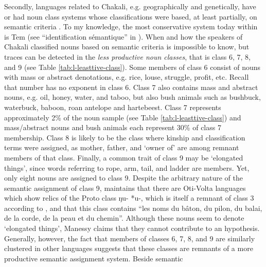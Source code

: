 \begin{exe}
\begin{exe}
\begin{exe}
\begin{exe}
\begin{exe}
\begin{exe}
Secondly, languages related to Chakali, e.g. geographically and genetically,  
 have or had noun class systems whose classifications were based, at least 
partially, on semantic criteria \citep{nade82}. To my knowledge, the most conservative system 
today  within  is Tem (see  ``identification sémantique'' in 
\citealt{Tcha07}). When and how the speakers of Chakali  classified nouns based on 
semantic criteria is impossible to know,  but traces can be detected in  the   
{\it less productive noun classes}, that is class 6, 7, 8, and 9 (see Table 
\ref{tab:l-leasttive-class}). Some members 
of class 6 consist of nouns with mass or abstract  denotations, e.g. rice,  
louse, struggle, profit, etc.  Recall that number has no exponent in class 6.  Class 7 also 
contains mass and abstract nouns, 
e.g. oil,  honey, water, and taboo, but also bush animals such as bushbuck, 
waterbuck, baboon, roan antelope and hartebeest. Class 7 represents 
approximately 2\% of the noun sample (see Table \ref{tab:l-leasttive-class}) and 
 mass/abstract nouns and bush animals each represent 30\% of class 7 
membership. Class 8 is likely to be the class where kinship and  
classification terms were assigned, as mother, father, and `owner of' are among 
remnant members of that class.  Finally, a  common trait of class 9 may be 
`elongated things', since words referring to  rope, arm, tail, and ladder are 
members. Yet, only eight nouns are assigned to class 9. Despite the arbitrary 
nature of the semantic assignment of class 9,  \citet[94]{Mane75} maintains that 
there are  {Oti-Volta} languages which show relics of  the Proto  class 
{\sls *ŋu- *u-}, which is  itself a remnant of  class 3   according to 
\citet[11]{Mieh07}, and that this class contains ``les noms du bâton, du pilon, 
du balai, de la corde, de la peau et du chemin''.  Although these nouns seem to 
denote `elongated  things',   Manessy claims that they cannot contribute to an 
hypothesis. Generally, however, the fact that members of classes 6, 7, 8, and 9 
are similarly clustered in other languages suggests that these classes are 
remnants of a more productive semantic assignment system. Beside semantic 

\end{exe}
\end{exe}
\end{exe}
\end{exe}
\end{exe}
\end{exe}
